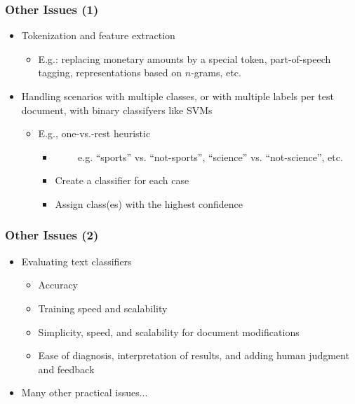 \documentclass{beamer}
\begin{document}
\begin{frame}
    \frametitle{Other Issues (1)}

    \begin{itemize}
    \item Tokenization and feature extraction
        \begin{itemize}
        \item E.g.: replacing monetary amounts by a special token, part-of-speech tagging, representations based on $n$-grams, etc.
        \end{itemize}
    
    \item Handling scenarios with multiple classes, or with multiple labels per test document, with binary classifyers like SVMs
        \begin{itemize}
        \item E.g., one-vs.-rest heuristic
            \begin{itemize}
            \item {\scriptsize ~~~~ e.g. ``sports'' vs. ``not-sports'', ``science'' vs.
                  ``not-science'', etc.}
            \item Create a classifier for each case
            \item Assign class(es) with the highest confidence
            \end{itemize}
        \end{itemize}
    \end{itemize}
\end{frame}

\begin{frame}
  \frametitle{Other Issues (2)}
  
  \begin{itemize}
  \item Evaluating text classifiers
    \begin{itemize}
    \item Accuracy
    \item Training speed and scalability
    \item Simplicity, speed, and scalability for document modifications
    \item Ease of diagnosis, interpretation of results, and adding human
      judgment and feedback
    \end{itemize}
  \end{itemize}
  \begin{itemize}
  \item Many other practical issues...
  \end{itemize}
\end{frame}


\end{document}
